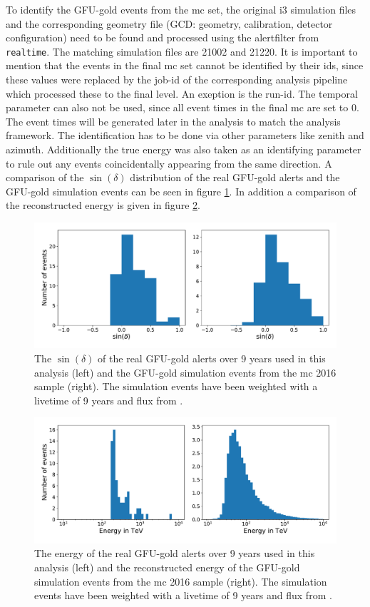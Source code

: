 To identify the GFU-gold events from the mc set, the original i3 simulation files and the corresponding geometry file (GCD: geometry, calibration, detector configuration) need to be found and processed using the alertfilter from \texttt{realtime}.
The matching simulation files are 21002 and 21220.
It is important to mention that the events in the final mc set cannot be identified by their ids, since these values were replaced by the job-id of the corresponding analysis pipeline which processed these to the final level.
An exeption is the run-id.
The temporal parameter can also not be used, since all event times in the final mc are set to \num{0}.
The event times will be generated later in the analysis to match the analysis framework.
The identification has to be done via other parameters like zenith and azimuth.
Additionally the true energy was also taken as an identifying parameter to rule out any events coincidentally appearing from the same direction.
A comparison of the $\sin{(\delta)}$ distribution of the real GFU-gold alerts and the GFU-gold simulation events can be seen in figure \ref{fig:gfu_gold_comp}.
In addition a comparison of the reconstructed energy is given in figure \ref{fig:gfu_gold_comp_energy}.
\begin{figure}
    \centering
    \includegraphics[width=12cm]{Plots/03_data/gfu_gold_comp.pdf}
    \caption{The $\sin{(\delta)}$ of the real GFU-gold alerts over 9 years used in this analysis (left) and the GFU-gold simulation events from the mc 2016 sample (right). The simulation events have been weighted with a livetime of 9 years and flux from \cite{flux}.}
    \label{fig:gfu_gold_comp}
\end{figure}
\begin{figure}
    \centering
    \includegraphics[width=12cm]{Plots/03_data/gfu_gold_energy_comp.pdf}
    \caption{The energy of the real GFU-gold alerts over 9 years used in this analysis (left) and the reconstructed energy of the GFU-gold simulation events from the mc 2016 sample (right). The simulation events have been weighted with a livetime of 9 years and flux from \cite{flux}.}
    \label{fig:gfu_gold_comp_energy}
\end{figure}

